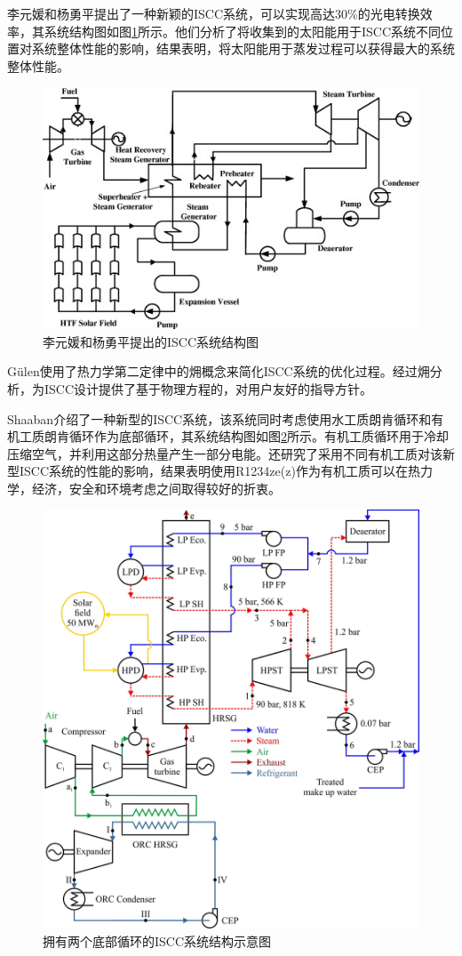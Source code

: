 李元媛和杨勇平\cite{Li2014}提出了一种新颖的ISCC系统，可以实现高达30\%的光电转换效率，其系统结构图如图\ref{fig:Li2014}所示。他们分析了将收集到的太阳能用于ISCC系统不同位置对系统整体性能的影响，结果表明，将太阳能用于蒸发过程可以获得最大的系统整体性能。
\begin{figure}[!ht]
\centering
\includegraphics[width=.8\textwidth]{fig/Li2014.jpg}
\caption{李元媛和杨勇平提出的ISCC系统结构图}
\label{fig:Li2014}
\end{figure}

G\"{u}len使用了热力学第二定律中的㶲概念来简化ISCC系统的优化过程。经过㶲分析，为ISCC设计提供了基于物理方程的，对用户友好的指导方针。

Shaaban\cite{Shaaban2016}介绍了一种新型的ISCC系统，该系统同时考虑使用水工质朗肯循环和有机工质朗肯循环作为底部循环，其系统结构图如图\ref{fig:Shaaban2016}所示。有机工质循环用于冷却压缩空气，并利用这部分热量产生一部分电能。还研究了采用不同有机工质对该新型ISCC系统的性能的影响，结果表明使用R1234ze(z)作为有机工质可以在热力学，经济，安全和环境考虑之间取得较好的折衷。
\begin{figure}[!ht]
\centering
\includegraphics[width=.8\textwidth]{fig/Shaaban2016.jpg}
\caption{拥有两个底部循环的ISCC系统结构示意图}\label{fig:Shaaban2016}
\end{figure}


